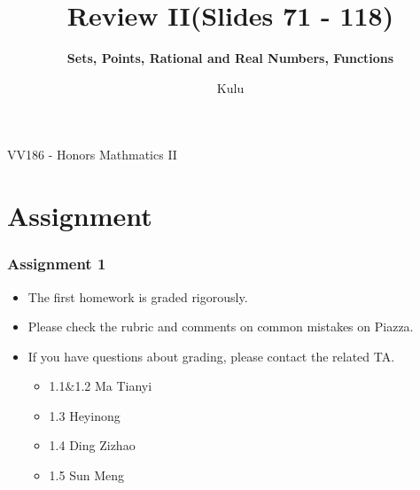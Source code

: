 \documentclass{beamer}
\title{\sffamily Review II(Slides 71 - 118)}
\subtitle{\textbf{Sets, Points, Rational and Real Numbers, Functions}}
\institute[UM-SJTU JI]{University of Michigan-Shanghai Jiao Tong University Joint Institute}
\author{Kulu}
\newcommand{\myfont}{\rmfamily\normalsize\upshape\mdseries}
\begin{document}
\begin{titlepage}
    \begin{center}
        VV186 - Honors Mathmatics II
    \end{center}
\end{titlepage}
\myfont

\section{Assignment}
\begin{frame}
    \frametitle{Assignment 1}
    \begin{itemize}
        \item The first homework is graded rigorously.
        \item Please check the rubric and comments on common mistakes on Piazza.
        \item If you have questions about grading, please contact the related TA.
              \begin{itemize}
                  \item 1.1$\&$1.2 Ma Tianyi
                  \item 1.3 Heyinong
                  \item 1.4 Ding Zizhao
                  \item 1.5 Sun Meng
              \end{itemize}
    \end{itemize}

\end{frame}
\end{document}
